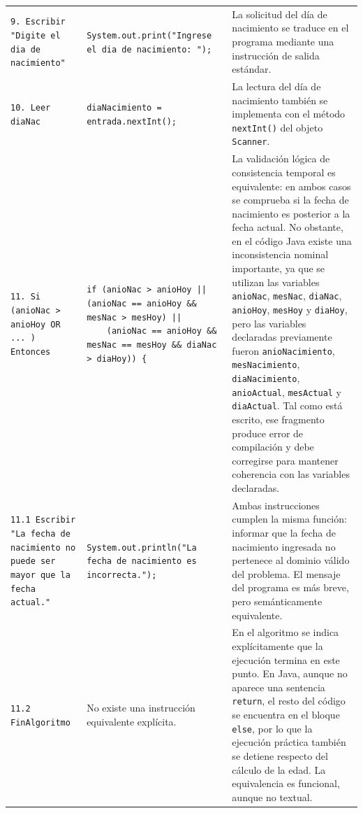 \documentclass[12pt,twoside]{book}
\begin{document}
\begin{landscape}
\begin{longtable}{p{6cm} p{6cm} p{7cm}}
							
							\texttt{9. Escribir "Digite el dia de nacimiento"}
							&
							\texttt{System.out.print("Ingrese el dia de nacimiento: ");}
							&
							La solicitud del día de nacimiento se traduce en el programa mediante una instrucción de salida estándar. \\
							
							
							\texttt{10. Leer diaNac}
							&
							\texttt{diaNacimiento = entrada.nextInt();}
							&
							La lectura del día de nacimiento también se implementa con el método \texttt{nextInt()} del objeto \texttt{Scanner}. \\
							
							
							\texttt{11. Si (anioNac > anioHoy OR ... ) Entonces}
							&
							\texttt{if (anioNac > anioHoy || (anioNac == anioHoy \&\& mesNac > mesHoy) ||} \newline
							\texttt{\ \ \ \ (anioNac == anioHoy \&\& mesNac == mesHoy \&\& diaNac > diaHoy)) \{}
							&
							La validación lógica de consistencia temporal es equivalente: en ambos casos se comprueba si la fecha de nacimiento es posterior a la fecha actual. No obstante, en el código Java existe una inconsistencia nominal importante, ya que se utilizan las variables \texttt{anioNac}, \texttt{mesNac}, \texttt{diaNac}, \texttt{anioHoy}, \texttt{mesHoy} y \texttt{diaHoy}, pero las variables declaradas previamente fueron \texttt{anioNacimiento}, \texttt{mesNacimiento}, \texttt{diaNacimiento}, \texttt{anioActual}, \texttt{mesActual} y \texttt{diaActual}. Tal como está escrito, ese fragmento produce error de compilación y debe corregirse para mantener coherencia con las variables declaradas. \\
							
							
							\texttt{11.1 Escribir "La fecha de nacimiento no puede ser mayor que la fecha actual."}
							&
							\texttt{System.out.println("La fecha de nacimiento es incorrecta.");}
							&
							Ambas instrucciones cumplen la misma función: informar que la fecha de nacimiento ingresada no pertenece al dominio válido del problema. El mensaje del programa es más breve, pero semánticamente equivalente. \\
							
							
							\texttt{11.2 FinAlgoritmo}
							&
							No existe una instrucción equivalente explícita.
							&
							En el algoritmo se indica explícitamente que la ejecución termina en este punto. En Java, aunque no aparece una sentencia \texttt{return}, el resto del código se encuentra en el bloque \texttt{else}, por lo que la ejecución práctica también se detiene respecto del cálculo de la edad. La equivalencia es funcional, aunque no textual. \\
							

\end{longtable}
\end{landscape}
\end{document}
